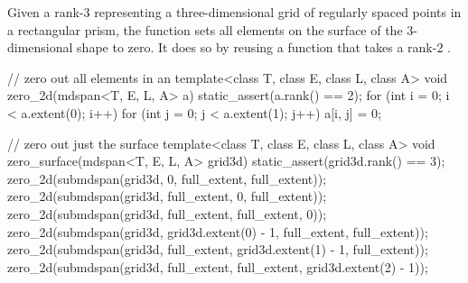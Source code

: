 \pnum
\begin{example}
Given a rank-3  representing a three-dimensional grid
of regularly spaced points in a rectangular prism,
the function  sets all elements on
the surface of the 3-dimensional shape to zero.
It does so by reusing a function 
that takes a rank-2 .

\begin{codeblock}
// zero out all elements in an 
template<class T, class E, class L, class A>
void zero_2d(mdspan<T, E, L, A> a) {
  static_assert(a.rank() == 2);
  for (int i = 0; i < a.extent(0); i++)
    for (int j = 0; j < a.extent(1); j++)
      a[i, j] = 0;
}

// zero out just the surface
template<class T, class E, class L, class A>
void zero_surface(mdspan<T, E, L, A> grid3d) {
  static_assert(grid3d.rank() == 3);
  zero_2d(submdspan(grid3d, 0, full_extent, full_extent));
  zero_2d(submdspan(grid3d, full_extent, 0, full_extent));
  zero_2d(submdspan(grid3d, full_extent, full_extent, 0));
  zero_2d(submdspan(grid3d, grid3d.extent(0) - 1, full_extent, full_extent));
  zero_2d(submdspan(grid3d, full_extent, grid3d.extent(1) - 1, full_extent));
  zero_2d(submdspan(grid3d, full_extent, full_extent, grid3d.extent(2) - 1));
}
\end{codeblock}
\end{example}
